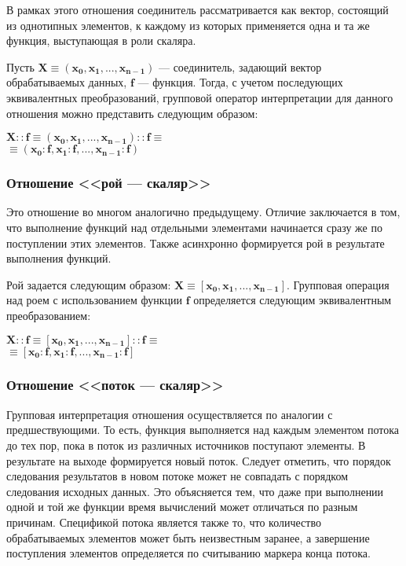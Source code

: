 В рамках этого отношения соединитель рассматривается как вектор, состоящий из однотипных элементов, к каждому из которых применяется одна и та же функция, выступающая в роли скаляра. 

Пусть $\mathbf{X \equiv (x_0, x_1, ..., x_{n-1})}$ --- соединитель, задающий вектор обрабатываемых данных, $\mathbf{f}$ --- функция. Тогда, с учетом последующих эквивалентных преобразований, групповой оператор интерпретации для данного отношения можно представить следующим образом:
\begin{center}
	$\mathbf{X::f \equiv (x_0, x_1, ..., x_{n-1})::f \equiv}$\\
	$\mathbf{\equiv (x_0:f, x_1:f, ..., x_{n-1}:f)}$
\end{center}

\subsubsection{Отношение <<рой --- скаляр>>}

Это отношение во многом аналогично предыдущему. Отличие заключается в том, что выполнение функций над отдельными элементами начинается сразу же по поступлении этих элементов. Также асинхронно формируется рой в результате выполнения функций.

Рой задается следующим образом: $\mathbf{X \equiv [x_0, x_1, ..., x_{n-1}]}$. Групповая операция над роем с использованием функции  $\mathbf{f}$ определяется следующим эквивалентным преобразованием:
\begin{center}
	$\mathbf{X::f \equiv [x_0, x_1, ..., x_{n-1}]::f \equiv}$\\
	$\mathbf{\equiv [x_0:f, x_1:f, ..., x_{n-1}:f]}$
\end{center}

\subsubsection{Отношение <<поток --- скаляр>>}

Групповая интерпретация отношения осуществляется по аналогии с предшествующими. То есть, функция выполняется над каждым элементом потока до тех пор, пока в поток из различных источников поступают элементы. В результате на выходе формируется новый поток. Следует отметить, что порядок следования результатов в новом потоке может не совпадать с порядком следования исходных данных. Это объясняется тем, что даже при выполнении одной и той же функции время вычислений может отличаться по разным причинам. Спецификой потока является также то, что количество обрабатываемых элементов может быть неизвестным заранее, а завершение поступления элементов определяется по считыванию маркера конца потока.

